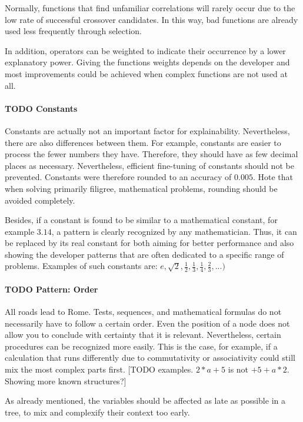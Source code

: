 Normally, functions that find unfamiliar correlations will rarely occur due to the low rate of successful crossover candidates. In this way, bad functions are already used less frequently through selection.

In addition, operators can be weighted to indicate their occurrence by a lower explanatory power. Giving the functions weights depends on the developer and most improvements could be achieved when complex functions are not used at all.

\paragraph{TODO Constants}
Constants are actually not an important factor for explainability. Nevertheless, there are also differences between them. For example, constants are easier to process the fewer numbers they have. Therefore, they should have as few decimal places as necessary. Nevertheless, efficient fine-tuning of constants should not be prevented. Constants were therefore rounded to an accuracy of $0.005$.
Hote that when solving primarily filigree, mathematical problems, rounding should be avoided completely.

Besides, if a constant is found to be similar to a mathematical constant, for example $3.14$, a pattern is clearly recognized by any mathematician. Thus, it can be replaced by its real constant for both aiming for better performance and also showing the developer patterns that are often dedicated to a specific range of problems. Examples of such constants are: $e, \sqrt{2}, \frac{1}{2}, \frac{1}{3}, \frac{1}{4}, \frac{2}{3}, ...)$ 

\paragraph{TODO Pattern: Order}
All roads lead to Rome. Tests, sequences, and mathematical formulas do not necessarily have to follow a certain order. Even the position of a node does not allow you to conclude with certainty that it is relevant. Nevertheless, certain procedures can be recognized more easily. This is the case, for example, if a calculation that runs differently due to commutativity or associativity could still mix the most complex parts first.
[TODO examples. $2*a+5$ is not $+5+a*2$. Showing more known structures?]

As already mentioned, the variables should be affected as late as possible in a tree, to mix and complexify their context too early.

